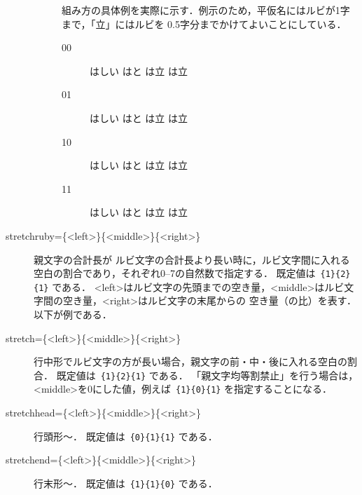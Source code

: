 \documentclass[a4paper,10pt]{ltjsarticle}
\begin{document}
\begin{description}
\begin{description}
組み方の具体例を実際に示す．例示のため，平仮名にはルビが1字まで，「立」にはルビを
0.5字分までかけてよいことにしている．
\begin{description}
\item[00]{%
%
はしい
  \quad はと\quad
は立\quad
は立\par}
\item[01]{%
%
はしい
  \quad はと\quad
は立\quad
は立\par}
\item[10]{%
%
はしい
  \quad はと\quad
は立\quad
は立\par}
\item[11]{%
%
はしい\quad
はと\quad
は立\quad
は立\par}
\end{description} 

\end{description}
\item[stretchruby=\{<left>\}\{<middle>\}\{<right>\}] 親文字の合計長が
ルビ文字の合計長より長い時に，ルビ文字間に入れる空白の割合であり，それぞれ0--7の自然数で指定する．
既定値は\ \verb+{1}{2}{1}+ である．
<left>はルビ文字の先頭までの空き量，<middle>はルビ文字間の空き量，<right>はルビ文字の末尾からの
空き量（の比）を表す．以下が例である．
\begin{LTXexample}[width=0.3\textwidth]
\end{LTXexample}
\item[stretch=\{<left>\}\{<middle>\}\{<right>\}]
行中形でルビ文字の方が長い場合，親文字の前・中・後に入れる空白の割合．
既定値は\ \verb+{1}{2}{1}+ である．
「親文字均等割禁止」を行う場合は，<middle>を0にした値，例えば\ 
\verb+{1}{0}{1}+ を指定することになる．

\item[stretchhead=\{<left>\}\{<middle>\}\{<right>\}] 行頭形〜．
既定値は\ \verb+{0}{1}{1}+ である．
\item[stretchend=\{<left>\}\{<middle>\}\{<right>\}] 行末形〜．
既定値は\ \verb+{1}{1}{0}+ である．


\end{description}
\end{document}
